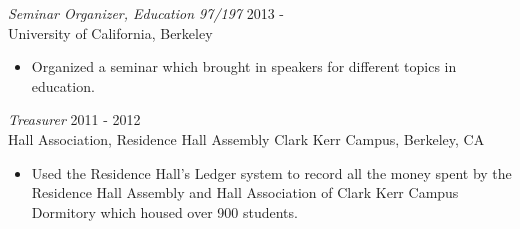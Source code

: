 \documentclass[margin]{res}
\begin{document}
\begin{resume}
                {\sl Seminar Organizer, Education 97/197} \hfill                       2013 -\\
                University of California, Berkeley
                \begin{itemize} \itemsep -2pt
                \item Organized a seminar which brought in speakers for different topics in education.
                \end{itemize}{\sl Treasurer} \hfill 2011 - 2012 \\
                Hall Association, Residence Hall Assembly \newline
                Clark Kerr Campus, Berkeley, CA
                 \begin{itemize}  \itemsep -2pt %
                 \item Used the Residence Hall's Ledger system to record all the money
								spent by the Residence Hall Assembly and Hall Association
								of Clark Kerr Campus Dormitory which housed over 900 students.
                \end{itemize}
 

 
 

\end{resume}
\end{document}
